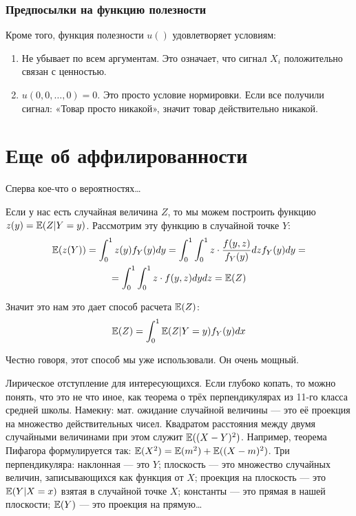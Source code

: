 \subsubsection*{Предпосылки на функцию полезности}
Кроме того, функция полезности $ u() $ удовлетворяет условиям:
\begin{enumerate}
\item Не убывает по всем аргументам. Это означает, что сигнал $ X_{i} $ положительно связан с ценностью.
\item $ u(0,0,\ldots,0)=0 $. Это просто условие нормировки. Если все получили сигнал: «Товар просто никакой», значит товар действительно никакой.
\end{enumerate}






\section{Еще об аффилированности}


Сперва кое-что о вероятностях\ldots

Если у нас есть случайная величина $ Z $, то мы можем построить функцию $z(y)= \mathbb{E}(Z|Y=y) $. Рассмотрим эту функцию в случайной точке $ Y $:
\begin{multline}
\mathbb{E}(z(Y))=\int_{0}^{1}z(y)f_{Y}(y)dy=\int_{0}^{1}\int_{0}^{1}z\cdot \frac{f(y,z)}{f_{Y}(y)}dz f_{Y}(y)dy=\\
=\int_{0}^{1}\int_{0}^{1}z\cdot f(y,z)dydz=\mathbb{E}(Z)
\end{multline}

Значит это нам это дает способ расчета $ \mathbb{E}(Z) $:
\begin{equation}
\label{conditional_way}
\mathbb{E}(Z)=\int_{0}^{1}\mathbb{E}(Z|Y=y)f_{Y}(y)dx
\end{equation}

Честно говоря, этот способ мы уже использовали. Он очень мощный.

Лирическое отступление для интересующихся. Если глубоко копать, то можно понять, что это не что иное, как теорема о трёх перпендикулярах из 11-го класса средней школы. Намекну: мат. ожидание случайной величины — это её проекция на множество действительных чисел. Квадратом расстояния между двумя случайными величинами при этом служит $ \mathbb{E}((X-Y)^{2}) $. Например, теорема Пифагора формулируется так: $ \mathbb{E}(X^{2})=\mathbb{E}(m^{2})+\mathbb{E}((X-m)^{2}) $. Три перпендикуляра: наклонная — это $ Y $; плоскость — это множество случайных величин, записывающихся как функция от $ X $; проекция на плоскость — это $ \mathbb{E}(Y|X=x) $ взятая в случайной точке $ X $; константы — это прямая в нашей плоскости; $ \mathbb{E}(Y) $ — это проекция на прямую\ldots


